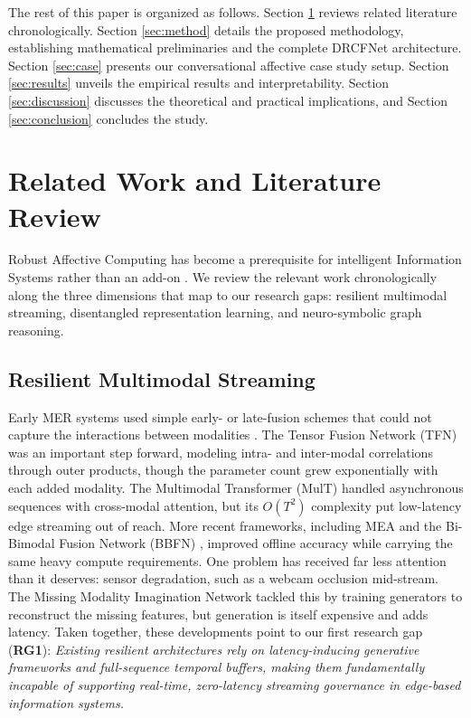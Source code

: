\documentclass[sn-mathphys,Numbered]{sn-jnl}
\theoremstyle{thmstyleone}
\theoremstyle{thmstyletwo}
\theoremstyle{thmstylethree}
\begin{document}
The rest of this paper is organized as follows. Section \ref{sec:lit} reviews related literature chronologically. Section \ref{sec:method} details the proposed methodology, establishing mathematical preliminaries and the complete DRCFNet architecture. Section \ref{sec:case} presents our conversational affective case study setup. Section \ref{sec:results} unveils the empirical results and interpretability. Section \ref{sec:discussion} discusses the theoretical and practical implications, and Section \ref{sec:conclusion} concludes the study.

\section{Related Work and Literature Review}\label{sec:lit}
Robust Affective Computing has become a prerequisite for intelligent Information Systems rather than an add-on \cite{picard2003affective, poria2017review}. We review the relevant work chronologically along the three dimensions that map to our research gaps: resilient multimodal streaming, disentangled representation learning, and neuro-symbolic graph reasoning.

\subsection{Resilient Multimodal Streaming}\label{subsec:lit_streaming}
Early MER systems used simple early- or late-fusion schemes that could not capture the interactions between modalities \cite{poria2017review}. The Tensor Fusion Network (TFN) \cite{zadeh2017tensor} was an important step forward, modeling intra- and inter-modal correlations through outer products, though the parameter count grew exponentially with each added modality. The Multimodal Transformer (MulT) \cite{tsai2019multimodal} handled asynchronous sequences with cross-modal attention, but its $O(T^2)$ complexity put low-latency edge streaming out of reach. More recent frameworks, including MEA \cite{yang2024asynchronous} and the Bi-Bimodal Fusion Network (BBFN) \cite{han2021bibimodal}, improved offline accuracy while carrying the same heavy compute requirements. One problem has received far less attention than it deserves: sensor degradation, such as a webcam occlusion mid-stream. The Missing Modality Imagination Network \cite{zhao2023missing} tackled this by training generators to reconstruct the missing features, but generation is itself expensive and adds latency. Taken together, these developments point to our first research gap (\textbf{RG1}): \textit{Existing resilient architectures rely on latency-inducing generative frameworks and full-sequence temporal buffers, making them fundamentally incapable of supporting real-time, zero-latency streaming governance in edge-based information systems.}
\end{document}
